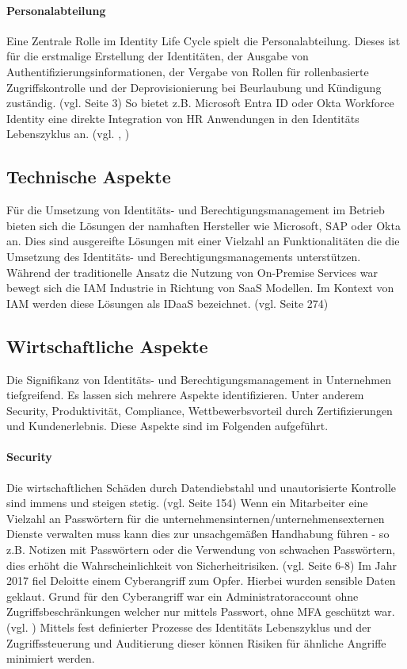 \documentclass[11pt]{article}
\begin{document}
\paragraph{Personalabteilung}
Eine Zentrale Rolle im Identity Life Cycle spielt die Personalabteilung. Dieses ist für die erstmalige Erstellung der Identitäten, der Ausgabe von Authentifizierungsinformationen, der Vergabe von Rollen für rollenbasierte Zugriffskontrolle und der Deprovisionierung bei Beurlaubung und Kündigung zuständig. (vgl. \cite{mohammed2017systematic} Seite 3) So bietet z.B. Microsoft Entra ID oder Okta Workforce Identity eine direkte Integration von HR Anwendungen in den Identitäts Lebenszyklus an. (vgl. \cite{oktahr}, \cite{Billmath2024})
\subsection{Technische Aspekte}
Für die Umsetzung von Identitäts- und Berechtigungsmanagement im Betrieb bieten sich die Lösungen der namhaften Hersteller wie Microsoft, SAP oder Okta an. Dies sind ausgereifte Lösungen mit einer Vielzahl an Funktionalitäten die die Umsetzung des Identitäts- und Berechtigungsmanagements unterstützen. Während der traditionelle Ansatz die Nutzung von On-Premise Services war bewegt sich die IAM Industrie in Richtung von SaaS Modellen. Im Kontext von IAM werden diese Lösungen als IDaaS bezeichnet. (vgl. \cite{kunz2014analyzing} Seite 274)
\subsection{Wirtschaftliche Aspekte}
Die Signifikanz von Identitäts- und Berechtigungsmanagement in Unternehmen tiefgreifend. Es lassen sich mehrere Aspekte identifizieren. Unter anderem Security, Produktivität, Compliance, Wettbewerbsvorteil durch Zertifizierungen und Kundenerlebnis. Diese Aspekte sind im Folgenden aufgeführt.
\paragraph{Security}
Die wirtschaftlichen Schäden durch Datendiebstahl und unautorisierte Kontrolle sind immens und steigen stetig. (vgl. \cite{furnell2020understanding} Seite 154) Wenn ein Mitarbeiter eine Vielzahl an Passwörtern für die unternehmensinternen/unternehmensexternen Dienste verwalten muss kann dies zur unsachgemäßen Handhabung führen - so z.B. Notizen mit Passwörtern oder die Verwendung von schwachen Passwörtern, dies erhöht die Wahrscheinlichkeit von Sicherheitrisiken. (vgl. \cite{haag2012selecting} Seite 6-8) Im Jahr 2017 fiel Deloitte einem Cyberangriff zum Opfer. Hierbei wurden sensible Daten geklaut. Grund für den Cyberangriff war ein Administratoraccount ohne Zugriffsbeschränkungen welcher nur mittels Passwort, ohne MFA geschützt war. (vgl. \cite{deloitte2017}) Mittels fest definierter Prozesse des Identitäts Lebenszyklus und der Zugriffssteuerung und Auditierung dieser können Risiken für ähnliche Angriffe minimiert werden.
\end{document}
